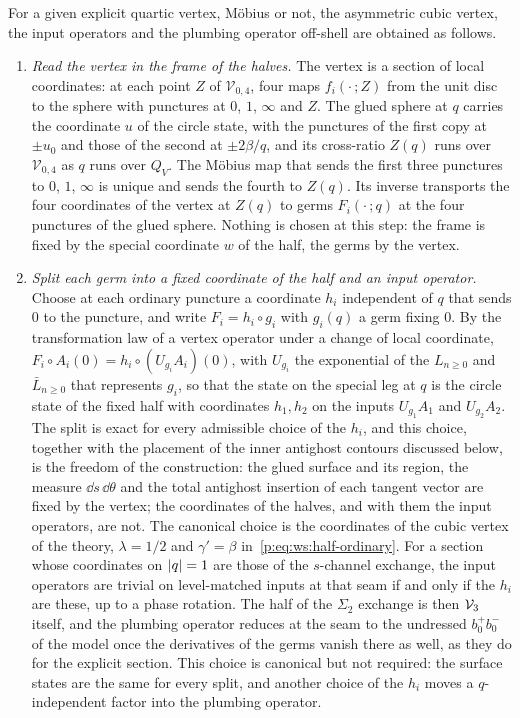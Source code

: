 For a given explicit quartic vertex, Möbius or not, the asymmetric cubic vertex, the input operators and the plumbing operator off-shell are obtained as follows.
\begin{enumerate}
  \setlength{\itemsep}{0.5ex}

  \item \emph{Read the vertex in the frame of the halves.}
    The vertex is a section of local coordinates: at each point $Z$ of $\mathcal V_{0, 4}$, four maps $f_i(\cdot \,; Z)$ from the unit disc to the sphere with punctures at $0$, $1$, $\infty$ and $Z$.
    The glued sphere at $q$ carries the coordinate $u$ of the circle state, with the punctures of the first copy at $\pm u_0$ and those of the second at $\pm 2 \beta / q$, and its cross-ratio $Z(q)$ runs over $\mathcal V_{0, 4}$ as $q$ runs over $Q_V$.
    The Möbius map that sends the first three punctures to $0$, $1$, $\infty$ is unique and sends the fourth to $Z(q)$.
    Its inverse transports the four coordinates of the vertex at $Z(q)$ to germs $F_i(\cdot \,; q)$ at the four punctures of the glued sphere.
    Nothing is chosen at this step: the frame is fixed by the special coordinate $w$ of the half, the germs by the vertex.

  \item \emph{Split each germ into a fixed coordinate of the half and an input operator.}
    Choose at each ordinary puncture a coordinate $h_i$ independent of $q$ that sends $0$ to the puncture, and write $F_i = h_i \circ g_i$ with $g_i(q)$ a germ fixing $0$.
    By the transformation law of a vertex operator under a change of local coordinate, $F_i \circ A_i(0) = h_i \circ (U_{g_i} A_i)(0)$, with $U_{g_i}$ the exponential of the $L_{n \geq 0}$ and $\bar L_{n \geq 0}$ that represents $g_i$, so that the state on the special leg at $q$ is the circle state of the fixed half with coordinates $h_1, h_2$ on the inputs $U_{g_1} A_1$ and $U_{g_2} A_2$.
    The split is exact for every admissible choice of the $h_i$, and this choice, together with the placement of the inner antighost contours discussed below, is the freedom of the construction: the glued surface and its region, the measure $\dd s \, \dd\theta$ and the total antighost insertion of each tangent vector are fixed by the vertex; the coordinates of the halves, and with them the input operators, are not.
    The canonical choice is the coordinates of the cubic vertex of the theory, $\lambda = 1 / 2$ and $\gamma' = \beta$ in~\eqref{p:eq:ws:half-ordinary}.
    For a section whose coordinates on ${|q|} = 1$ are those of the $s$-channel exchange, the input operators are trivial on level-matched inputs at that seam if and only if the $h_i$ are these, up to a phase rotation.
    The half of the $\Sigma_2$ exchange is then $\mathcal{V}_{3}$ itself, and the plumbing operator reduces at the seam to the undressed $b_0^+ b_0^-$ of the model once the derivatives of the germs vanish there as well, as they do for the explicit section.
    This choice is canonical but not required: the surface states are the same for every split, and another choice of the $h_i$ moves a $q$-independent factor into the plumbing operator.


\end{enumerate}
